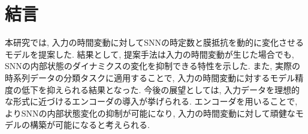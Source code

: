 \section{結言}

本研究では, 入力の時間変動に対してSNNの時定数と膜抵抗を動的に変化させるモデルを提案した.
結果として, 提案手法は入力の時間変動が生じた場合でも, SNNの内部状態のダイナミクスの変化を抑制できる特性を示した.
また, 実際の時系列データの分類タスクに適用することで, 入力の時間変動に対するモデル精度の低下を抑えられる結果となった.
今後の展望としては, 入力データを理想的な形式に近づけるエンコーダの導入が挙げられる.
エンコーダを用いることで, よりSNNの内部状態変化の抑制が可能になり, 入力の時間変動に対して頑健なモデルの構築が可能になると考えられる.
% 
% 
% 